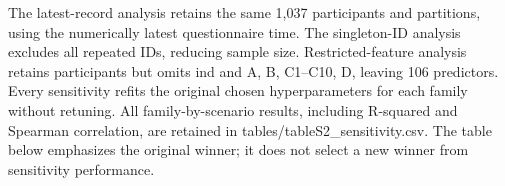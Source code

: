 \documentclass[11pt,letterpaper]{article}
\begin{document}
The latest-record analysis retains the same 1,037 participants and partitions, using the numerically latest questionnaire time. The singleton-ID analysis excludes all repeated IDs, reducing sample size. Restricted-feature analysis retains participants but omits ind and A, B, C1--C10, D, leaving 106 predictors. Every sensitivity refits the original chosen hyperparameters for each family without retuning. All family-by-scenario results, including R-squared and Spearman correlation, are retained in tables/tableS2\_\allowbreak{}sensitivity.csv. The table below emphasizes the original winner; it does not select a new winner from sensitivity performance.


\par\medskip{}\par\nopagebreak

\begingroup\singlespacing\fontsize{10}{12}\selectfont\setlength{\parindent}{0pt}
\end{document}
